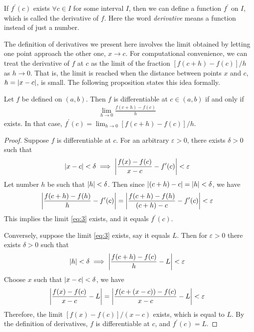\documentclass[thmcnt=section, 12pt]{my-elegantbook}
\begin{document}
If $f^\prime(c)$ exists $\forall c \in I$ for some interval $I$, then we can define a function $f^\prime$ on $I$, which is called the derivative of $f$. Here the word \textit{derivative} means a function instead of just a number. 


The definition of derivatives we present here involves the limit obtained by letting one point approach the other one, $x \to c$. For computational convenience, we can treat the derivative of $f$ at $c$ as the limit of the fraction $[ f(c+h) - f(c) ] / h$ as $h \to 0$. That is, the limit is reached when the distance between points $x$ and $c$, $h = \left\lvert x-c \right\rvert$, is small. The following proposition states this idea formally.

\begin{proposition} \label{pro:1}
    Let $f$ be defined on $(a, b)$. Then $f$ is differentiable at $c \in (a, b)$ if and only if 
    \begin{align}
        \lim_{h \to 0} \frac{f(c+h) - f(c)}{h} 
        \label{eq:3}
    \end{align}
    exists. In that case, $f^\prime(c) = \lim_{h \to 0} [ f(c+h) - f(c) ] / h$.
\end{proposition}

\begin{proof}
    Suppose $f$ is differentiable at $c$. For an arbitrary $\varepsilon > 0$, there exists $\delta > 0$ such that 
    \begin{align*}
        \left\lvert x - c \right\rvert < \delta
        \implies \left\lvert \frac{f(x) - f(c)}{x - c} - f^\prime(c) \right\rvert < \varepsilon
    \end{align*}
    Let number $h$ be such that $\left\lvert h \right\rvert < \delta$. Then since $\left\lvert (c+h) - c \right\rvert = \left\lvert h \right\rvert < \delta$, we have 
    \begin{align*}
        \left\lvert \frac{f(c+h) - f(h)}{h} - f^\prime(c) \right\rvert
        = \left\lvert \frac{f(c+h) - f(h)}{(c+h) - c} - f^\prime(c) \right\rvert < \varepsilon
    \end{align*}
    This implies the limit \eqref{eq:3} exists, and it equals $f^\prime(c)$.

    Conversely, suppose the limit \eqref{eq:3} exists, say it equals $L$. Then for $\varepsilon > 0$ there exists $\delta > 0$ such that 
    \begin{align*}
        \left\lvert h \right\rvert < \delta
        \implies \left\lvert \frac{f(c+h) - f(c)}{h} - L \right\rvert < \varepsilon
    \end{align*}
    Choose $x$ such that $\left\lvert x - c \right\rvert < \delta$, we have 
    \begin{align*}
        \left\lvert 
            \frac{f(x) - f(c)}{x - c} - L
         \right\rvert = \left\lvert 
            \frac{f(c + (x - c)) - f(c)}{x - c} - L
         \right\rvert < \varepsilon
    \end{align*}
    Therefore, the limit $[f(x) - f(c)]/(x - c)$ exists, which is equal to $L$. By the definition of derivatives, $f$ is differentiable at $c$, and $f^\prime(c) = L$.
\end{proof}
\end{document}
